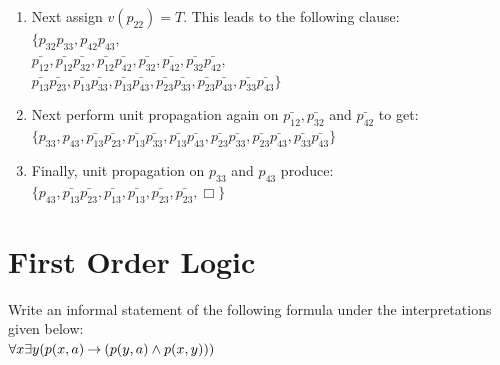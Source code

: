 \documentclass[]{exam}
\begin{document}
\begin{questions}
\begin{parts}
\begin{solution}
\begin{enumerate}
\item Next assign $v(p_{22}) = T$. This leads to the following clause:\\
$\{ 
         p_{32}p_{33}, 
         p_{42}p_{43},$ \\
$\bar{p_{12}},
 \bar{p_{12}}\bar{p_{32}},
 \bar{p_{12}}\bar{p_{42}},
             \bar{p_{32}},
             \bar{p_{42}},
 \bar{p_{32}}\bar{p_{42}},$\\
$\bar{p_{13}}\bar{p_{23}},
 \bar{p_{13}}\bar{p_{33}},
 \bar{p_{13}}\bar{p_{43}},
 \bar{p_{23}}\bar{p_{33}},
 \bar{p_{23}}\bar{p_{43}},
 \bar{p_{33}}\bar{p_{43}}\}$ \\
\item Next perform unit propagation again on $\bar{p_{12}}, \bar{p_{32}}$ and
$\bar{p_{42}}$ to get:\\
$\{ 
               p_{33}, 
               p_{43},
 \bar{p_{13}}\bar{p_{23}},
 \bar{p_{13}}\bar{p_{33}},
 \bar{p_{13}}\bar{p_{43}},
 \bar{p_{23}}\bar{p_{33}},
 \bar{p_{23}}\bar{p_{43}},
 \bar{p_{33}}\bar{p_{43}}\}$ \\
\item Finally, unit propagation on $p_{33}$ and $p_{43}$ produce:\\
$\{ 
               p_{43},
 \bar{p_{13}}\bar{p_{23}},
 \bar{p_{13}}            ,
 \bar{p_{13}}            ,
 \bar{p_{23}}            ,
 \bar{p_{23}}            ,
             \Box       \}$ \\
\end{enumerate}
\end{solution}
\end{parts}
\section*{First Order Logic}
\question Write an informal statement of the following formula under the
interpretations given below:\\ 
$\forall x \exists y (p(x,a) \mathbin{\rightarrow} (p(y,a) \land p(x,y)))$
\end{questions}
\end{document}
